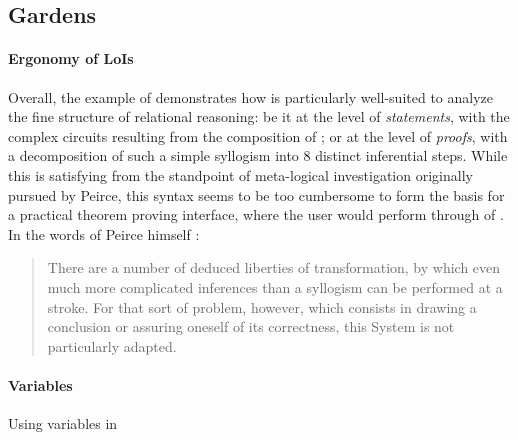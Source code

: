 \begin{scope}
\begin{scope}
\section{Gardens}

\paragraph{Ergonomy of LoIs}

Overall, the example of  demonstrates how 
is particularly well-suited to analyze the fine structure of relational
reasoning: be it at the level of \emph{statements}, with the complex circuits
resulting from the composition of ; or at the level of \emph{proofs}, with a
decomposition of such a simple syllogism into 8 distinct inferential steps.
While this is satisfying from the standpoint of meta-logical investigation
originally pursued by Peirce, this syntax seems to be too cumbersome to form the
basis for a practical theorem proving interface, where the user would perform
 through  of . In the words of
Peirce himself \cite[p.~544]{peirce_prolegomena_1906}:
\begin{quote}
  There are a number of deduced liberties of transformation, by which even much
  more complicated inferences than a syllogism can be performed at a stroke. For
  that sort of problem, however, which consists in drawing a conclusion or
  assuring oneself of its correctness, this System is not particularly adapted.
\end{quote}

\paragraph{Variables}

\begin{marginfigure}
  \hspace{-3em}
  \caption{Using variables in }
\end{marginfigure}


\end{scope}
\end{scope}
